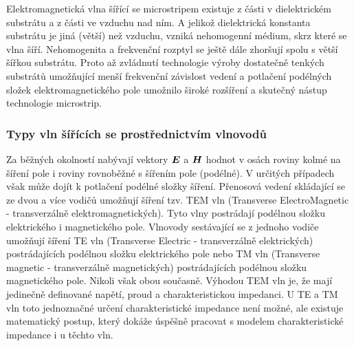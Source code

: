 \documentclass[12pt,a4paper,oneside]{article}
\numberwithin{equation}{section} %
\numberwithin{figure}{section} %
\numberwithin{table}{section} %
\renewcommand{\vec}[1]{\mbox{\boldmath$#1$}} %
\begin{document}
Elektromagnetická vlna šířící se microstripem existuje z části v dielektrickém substrátu a z části ve vzduchu nad ním. A jelikož dielektrická konstanta substrátu je jiná (větší) než vzduchu, vzniká nehomogenní médium, skrz které se vlna šíří. Nehomogenita a frekvenční rozptyl se ještě dále zhoršují spolu s větší šířkou substrátu. Proto až zvládnutí technologie výroby dostatečně tenkých substrátů umožňující menší frekvenční závislost vedení a potlačení podélných složek elektromagnetického pole umožnilo široké rozšíření a skutečný nástup technologie microstrip.

\subsubsection{Typy vln šířících se prostřednictvím vlnovodů}
Za běžných okolností nabývají vektory $\vec{E}$ a $\vec{H}$ hodnot v osách roviny kolmé na šíření pole i roviny rovnoběžné s šířením pole (podélné). V určitých případech však může dojít k potlačení podélné složky šíření. Přenosová vedení skládající se ze dvou a více vodičů umožňují šíření tzv. TEM vln (Transverse ElectroMagnetic - transverzálně elektromagnetických). Tyto vlny postrádají podélnou složku elektrického i magnetického pole. Vlnovody sestávající se z jednoho vodiče umožňují šíření TE vln (Transverse Electric - transverzálně elektrických) postrádajících podélnou složku elektrického pole nebo TM vln (Transverse magnetic - transverzálně magnetických) postrádajících podélnou složku magnetického pole. Nikoli však obou současně. Výhodou TEM vln je, že mají jedinečně definované napětí, proud a charakteristickou impedanci. U TE a TM vln toto jednoznačné určení charakteristické impedance není možné, ale existuje matematický postup, který dokáže úspěšně pracovat s modelem charakteristické impedance i u těchto vln.
\end{document}
